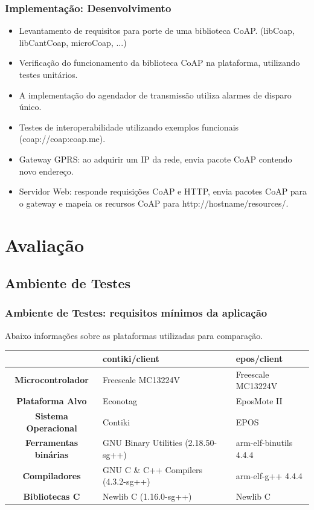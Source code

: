 \documentclass{beamer}
\begin{document}
\begin{frame}
\frametitle{Implementação: Desenvolvimento}
\begin{itemize}
    \item Levantamento de requisitos para porte de uma biblioteca CoAP. (libCoap, libCantCoap, microCoap, ...)
    \item Verificação do funcionamento da biblioteca CoAP na plataforma, utilizando testes unitários.
    \item A implementação do agendador de transmissão utiliza alarmes de disparo único.
    \item Testes de interoperabilidade utilizando exemplos funcionais (coap://coap:coap.me).
\item Gateway GPRS: ao adquirir um IP da rede, envia pacote CoAP contendo novo endereço.
\item Servidor Web: responde requisições CoAP e HTTP, envia pacotes CoAP para o gateway e mapeia os recursos CoAP para http://hostname/resources/.
\end{itemize}
\end{frame}

\section{Avaliação}

\subsection{Ambiente de Testes}
\begin{frame}
\frametitle{Ambiente de Testes: requisitos mínimos da aplicação}
Abaixo informações sobre as plataformas utilizadas para comparação.
 \begin{table}[!ht]
  \centering
  \scriptsize
  \begin{tabular}{|c|p{3cm}|p{3cm}|}
	\hline
	& \textbf{contiki/client} & \textbf{epos/client}  \\ \hline
	\textbf{Microcontrolador}	  	  & Freescale MC13224V & Freescale MC13224V \\ \hline 
	\textbf{Plataforma Alvo}    & Econotag & EposMote II\\ \hline    
	\textbf{Sistema Operacional}    & Contiki & EPOS \\ \hline    
    \textbf{Ferramentas binárias}		  & GNU Binary Utilities (2.18.50-sg++) & arm-elf-binutils 4.4.4 \\ \hline
    \textbf{Compiladores}		  & GNU C \& C++ Compilers (4.3.2-sg++) & arm-elf-g++ 4.4.4\\ \hline
    \textbf{Bibliotecas C}          & Newlib C (1.16.0-sg++) & Newlib C \\ \hline 
	\end{tabular}
  \end{table}
\end{frame}
\end{document}
